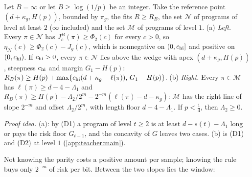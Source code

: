 \begin{proposition}\label{prop:teacher:kinks}
Let $B=\infty$ or let $B\ge\log(1/p)$ be an integer. Take the reference point $(d+\kappa_g,H(p))$, bounded by $\pi_g$, the fits $R\ge R_B$, the set $\mathcal N$ of programs of level at least $2$ ($\infty$ included) and the set $\mathcal M$ of programs of level $1$.
(a) \emph{Left.} Every $\pi\in\mathcal N$ has $J^B_c(\pi)\ge\Phi_2(c)$ for every $c>0$, so $\eta_{\mathcal N}(c)\ge\Phi_2(c)-J_g(c)$, which is nonnegative on $(0,c_{\rm hi}]$ and positive on $(0,c_{\rm hi})$. If $c_{\rm hi}>0$, every $\pi\in\mathcal N$ lies above the wedge with apex $(d+\kappa_g,H(p))$, steepness $c_{\rm hi}$ and margin $G_1-H(p)$: $R_B(\pi)\ge H(p)+\max\{c_{\rm hi}(d+\kappa_g-\ell(\pi)),\,G_1-H(p)\}$.
(b) \emph{Right.} Every $\pi\in\mathcal M$ has $\ell(\pi)\ge d-4-\Lambda_1$ and $R_B(\pi)\ge H(p)-\Lambda_2/2^m-2^{-m}(\ell(\pi)-d-\kappa_g)$: $\mathcal M$ has the right line of slope $2^{-m}$ and offset $\Lambda_2/2^m$, with length floor $d-4-\Lambda_1$. If $p<\frac14$, then $\Lambda_2\ge0$.
\end{proposition}

\emph{Proof idea.} (a): by (D1) a program of level $t\ge2$ is at least $d-s(t)-\Lambda_1$ long or pays the risk floor $G_{t-1}$, and the concavity of $G$ leaves two cases. (b) is (D1) and (D2) at level $1$ (\cref{app:teacher:main}).

Not knowing the parity costs a positive amount per sample; knowing the rule buys only $2^{-m}$ of risk per bit. Between the two slopes lies the window:

